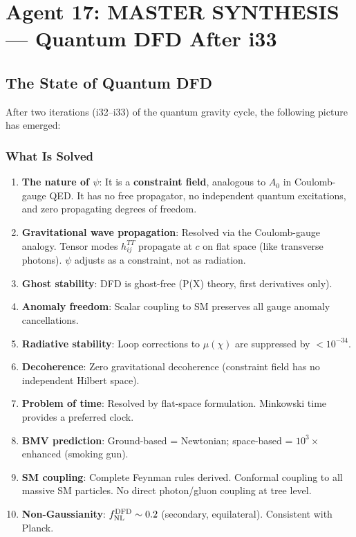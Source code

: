 \documentclass[11pt,a4paper]{article}
\begin{document}
\newpage

\section{Agent 17: MASTER SYNTHESIS --- Quantum DFD After i33}
\label{sec:agent17}

\subsection{The State of Quantum DFD}

After two iterations (i32--i33) of the quantum gravity cycle, the following picture has emerged:

\subsubsection{What Is Solved}

\begin{enumerate}
\item \textbf{The nature of $\psi$}: It is a \textbf{constraint field}, analogous to $A_0$ in Coulomb-gauge QED. It has no free propagator, no independent quantum excitations, and zero propagating degrees of freedom.

\item \textbf{Gravitational wave propagation}: Resolved via the Coulomb-gauge analogy. Tensor modes $h_{ij}^{TT}$ propagate at $c$ on flat space (like transverse photons). $\psi$ adjusts as a constraint, not as radiation.

\item \textbf{Ghost stability}: DFD is ghost-free (P(X) theory, first derivatives only).

\item \textbf{Anomaly freedom}: Scalar coupling to SM preserves all gauge anomaly cancellations.

\item \textbf{Radiative stability}: Loop corrections to $\mu(\chi)$ are suppressed by $< 10^{-34}$.

\item \textbf{Decoherence}: Zero gravitational decoherence (constraint field has no independent Hilbert space).

\item \textbf{Problem of time}: Resolved by flat-space formulation. Minkowski time provides a preferred clock.

\item \textbf{BMV prediction}: Ground-based = Newtonian; space-based = $10^3\times$ enhanced (smoking gun).

\item \textbf{SM coupling}: Complete Feynman rules derived. Conformal coupling to all massive SM particles. No direct photon/gluon coupling at tree level.

\item \textbf{Non-Gaussianity}: $f_{\rm NL}^{\rm DFD} \sim 0.2$ (secondary, equilateral). Consistent with Planck.
\end{enumerate}
\end{document}
